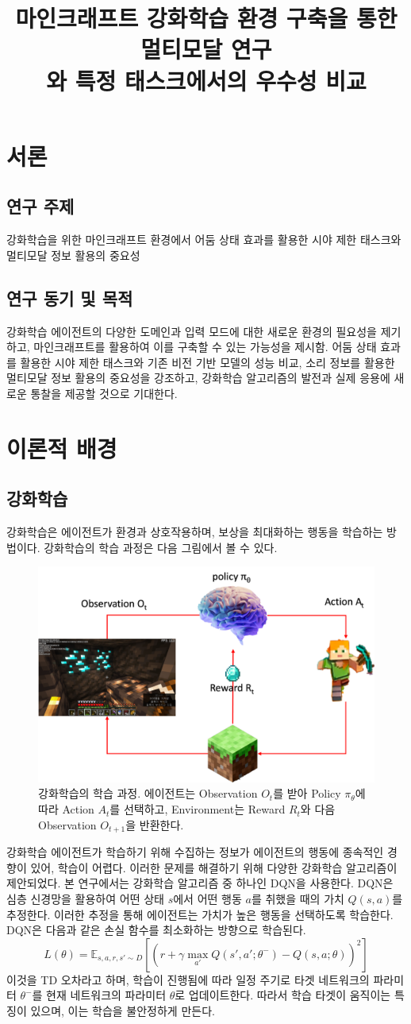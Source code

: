 \documentclass{tudelftposter}
\title{마인크래프트 강화학습 환경 구축을 통한 멀티모달 연구\\
\large 와 특정 태스크에서의 우수성 비교}
\begin{document}
\section{서론}
\subsection{연구 주제}
강화학습을 위한 마인크래프트 환경에서 어둠 상태 효과를 활용한 시야 제한 태스크와 멀티모달 정보 활용의 중요성

\subsection{연구 동기 및 목적}
강화학습 에이전트의 다양한 도메인과 입력 모드에 대한 새로운 환경의 필요성을 제기하고, 마인크래프트를 활용하여 이를 구축할 수 있는 가능성을 제시함. 어둠 상태 효과를 활용한 시야 제한 태스크와 기존 비전 기반 모델의 성능 비교, 소리 정보를 활용한 멀티모달 정보 활용의 중요성을 강조하고, 강화학습 알고리즘의 발전과 실제 응용에 새로운 통찰을 제공할 것으로 기대한다.

\section{이론적 배경}
\subsection{강화학습}
강화학습은 에이전트가 환경과 상호작용하며, 보상을 최대화하는 행동을 학습하는 방법이다. 강화학습의 학습 과정은 다음 그림에서 볼 수 있다.

\begin{figure}
  \centering
  \includegraphics[width=.35\textwidth]{reinforcement.png}
  \caption{강화학습의 학습 과정. 에이전트는 Observation $O_t$를 받아 Policy $\pi_\theta$에 따라 Action $A_t$를 선택하고, Environment는 Reward $R_t$와 다음 Observation $O_{t+1}$을 반환한다.}
  \label{fig:reinforcement}
\end{figure}
강화학습 에이전트가 학습하기 위해 수집하는 정보가 에이전트의 행동에 종속적인 경향이 있어, 학습이 어렵다. 이러한 문제를 해결하기 위해 다양한 강화학습 알고리즘이 제안되었다. 본 연구에서는 강화학습 알고리즘 중 하나인 DQN을 사용한다. DQN은 심층 신경망을 활용하여 어떤 상태 $s$에서 어떤 행동 $a$를 취했을 때의 가치 $Q(s,a)$를 추정한다. 이러한 추정을 통해 에이전트는 가치가 높은 행동을 선택하도록 학습한다. DQN은 다음과 같은 손실 함수를 최소화하는 방향으로 학습된다.
\begin{equation}
  L(\theta) = \mathbb{E}_{s,a,r,s' \sim D}[(r + \gamma \max_{a'}Q(s',a';\theta^-) - Q(s,a;\theta))^2]
\end{equation}
이것을 TD 오차라고 하며, 학습이 진행됨에 따라 일정 주기로 타겟 네트워크의 파라미터 $\theta^-$를 현재 네트워크의 파라미터 $\theta$로 업데이트한다. 따라서 학습 타겟이 움직이는 특징이 있으며, 이는 학습을 불안정하게 만든다.
\end{document}
